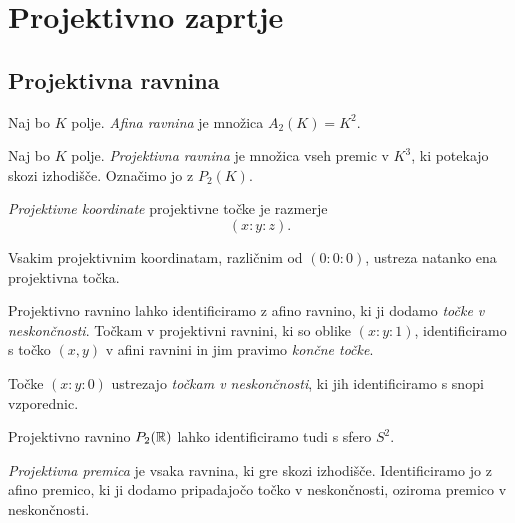 \section{Projektivno zaprtje}

\subsection{Projektivna ravnina}


\begin{definicija}
Naj bo $K$ polje. \emph{Afina ravnina} je
množica $A_2(K) = K^2$.
\end{definicija}

\begin{definicija}
Naj bo $K$ polje.
\emph{Projektivna ravnina} je množica
vseh premic v $K^3$, ki potekajo skozi izhodišče. Označimo jo z
$P_2(K)$.
\end{definicija}

\begin{definicija}
\emph{Projektivne koordinate}
projektivne točke je razmerje
\[
(x : y : z).
\]
\end{definicija}

\begin{opomba}
Vsakim projektivnim koordinatam, različnim od $(0 : 0 : 0)$,
ustreza natanko ena projektivna točka.
\end{opomba}

\begin{opomba}
Projektivno ravnino lahko identificiramo z afino ravnino, ki ji
dodamo \emph{točke v neskončnosti}. Točkam v projektivni ravnini,
ki so oblike $(x : y : 1)$, identificiramo s točko $(x, y)$ v afini
ravnini in jim pravimo \emph{končne točke}.

Točke $(x : y : 0)$ ustrezajo \emph{točkam v neskončnosti}, ki jih
identificiramo s snopi vzporednic.
\end{opomba}

\begin{opomba}
Projektivno ravnino $P_2(\mathbb{R})$ lahko identificiramo tudi s sfero
$S^2$.
\end{opomba}

\begin{definicija}
\emph{Projektivna premica} je
vsaka ravnina, ki gre skozi izhodišče. Identificiramo jo z afino
premico, ki ji dodamo pripadajočo točko v neskončnosti, oziroma
premico v neskončnosti.
\end{definicija}

